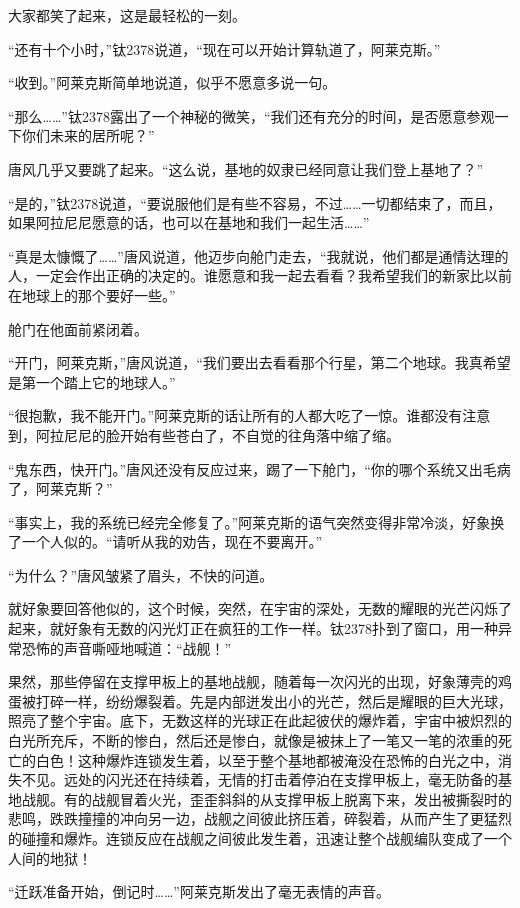 大家都笑了起来，这是最轻松的一刻。 

“还有十个小时，”钛2378说道，“现在可以开始计算轨道了，阿莱克斯。” 

“收到。”阿莱克斯简单地说道，似乎不愿意多说一句。 

“那么……”钛2378露出了一个神秘的微笑，“我们还有充分的时间，是否愿意参观一下你们未来的居所呢？” 

唐风几乎又要跳了起来。“这么说，基地的奴隶已经同意让我们登上基地了？” 

“是的，”钛2378说道，“要说服他们是有些不容易，不过……一切都结束了，而且，如果阿拉尼尼愿意的话，也可以在基地和我们一起生活……” 

“真是太慷慨了……”唐风说道，他迈步向舱门走去，“我就说，他们都是通情达理的人，一定会作出正确的决定的。谁愿意和我一起去看看？我希望我们的新家比以前在地球上的那个要好一些。” 

舱门在他面前紧闭着。 

“开门，阿莱克斯，”唐风说道，“我们要出去看看那个行星，第二个地球。我真希望是第一个踏上它的地球人。” 

“很抱歉，我不能开门。”阿莱克斯的话让所有的人都大吃了一惊。谁都没有注意到，阿拉尼尼的脸开始有些苍白了，不自觉的往角落中缩了缩。 

“鬼东西，快开门。”唐风还没有反应过来，踢了一下舱门，“你的哪个系统又出毛病了，阿莱克斯？” 

“事实上，我的系统已经完全修复了。”阿莱克斯的语气突然变得非常冷淡，好象换了一个人似的。“请听从我的劝告，现在不要离开。” 

“为什么？”唐风皱紧了眉头，不快的问道。 

就好象要回答他似的，这个时候，突然，在宇宙的深处，无数的耀眼的光芒闪烁了起来，就好象有无数的闪光灯正在疯狂的工作一样。钛2378扑到了窗口，用一种异常恐怖的声音嘶哑地喊道：“战舰！” 

果然，那些停留在支撑甲板上的基地战舰，随着每一次闪光的出现，好象薄壳的鸡蛋被打碎一样，纷纷爆裂着。先是内部迸发出小的光芒，然后是耀眼的巨大光球，照亮了整个宇宙。底下，无数这样的光球正在此起彼伏的爆炸着，宇宙中被炽烈的白光所充斥，不断的惨白，然后还是惨白，就像是被抹上了一笔又一笔的浓重的死亡的白色！这种爆炸连锁发生着，以至于整个基地都被淹没在恐怖的白光之中，消失不见。远处的闪光还在持续着，无情的打击着停泊在支撑甲板上，毫无防备的基地战舰。有的战舰冒着火光，歪歪斜斜的从支撑甲板上脱离下来，发出被撕裂时的悲鸣，跌跌撞撞的冲向另一边，战舰之间彼此挤压着，碎裂着，从而产生了更猛烈的碰撞和爆炸。连锁反应在战舰之间彼此发生着，迅速让整个战舰编队变成了一个人间的地狱！ 

“迁跃准备开始，倒记时……”阿莱克斯发出了毫无表情的声音。 

